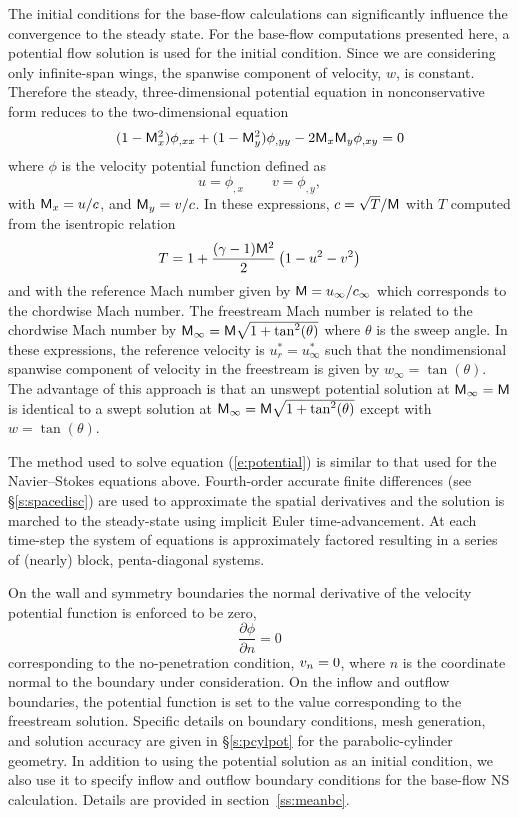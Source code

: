 The initial conditions for the base-flow calculations can significantly
influence the convergence to the steady state.  For the base-flow computations
presented here, a potential flow solution is used for the initial condition.
Since we are considering only infinite-span wings, the spanwise component of
velocity, $w$, is constant.  Therefore the steady, three-dimensional potential
equation in nonconservative form reduces to the two-dimensional equation
%
\begin{equation} \label{e:potential}
(1-{\sf M}_x^2) \phi_{,xx} + (1-{\sf M}_y^2) \phi_{,yy} - 2{\sf M}_x{\sf M}_y \phi_{,xy} = 0
\end{equation}
%
where $\phi$ is the velocity potential function defined as
%
\begin{equation}
u = \phi_{,x} \qquad v = \phi_{,y} ,
\end{equation}
%
with ${\sf M}_x = u / c$, and ${\sf M}_y = v / c$.  In these expressions, $c = \sqrt{T}
/ {\sf M}$ with $T$ computed from the isentropic relation
%
\begin{equation}
  T = 1 + \frac{(\gamma-1){\sf M}^2}{2} \left( 1 - u^2 - v^2 \right)
\end{equation}
%
and with the reference Mach number given by ${\sf M} = u_\infty / c_\infty$ which
corresponds to the chordwise Mach number.  The freestream Mach number is
related to the chordwise Mach number by ${\sf M}_\infty = {\sf M} \sqrt{1 +
\tan^2(\theta)}$ where $\theta$ is the sweep angle.  In these expressions, the
reference velocity is $u^*_r = u^*_\infty$ such that the nondimensional
spanwise component of velocity in the freestream is given by $w_\infty =
\tan(\theta)$.  The advantage of this approach is that an unswept potential
solution at ${\sf M}_\infty = {\sf M}$ is identical to a swept solution at ${\sf M}_\infty =
{\sf M} \sqrt{1 + \tan^2(\theta)}$ except with $w = \tan(\theta)$.

The method used to solve equation (\ref{e:potential}) is similar to that used
for the Navier--Stokes equations above.  Fourth-order accurate finite
differences (see \S\ref{s:spacedisc}) are used to approximate the spatial
derivatives and the solution is marched to the steady-state using implicit
Euler time-advancement.  At each time-step the system of equations is
approximately factored resulting in a series of (nearly) block, penta-diagonal
systems.

On the wall and symmetry boundaries the normal derivative of the velocity
potential function is enforced to be zero,
%
\begin{equation}
  \frac{\partial \phi}{\partial n} = 0
\end{equation}
%
corresponding to the no-penetration condition, ${v_n} = 0$, where $n$ is the
coordinate normal to the boundary under consideration.  On the inflow and
outflow boundaries, the potential function is set to the value corresponding
to the freestream solution.  Specific details on boundary conditions, mesh
generation, and solution accuracy are given in \S\ref{s:pcylpot} for the
parabolic-cylinder geometry.  In addition to using the potential solution as
an initial condition, we also use it to specify inflow and outflow boundary
conditions for the base-flow NS calculation.  Details are provided in
section~\ref{ss:meanbc}.

